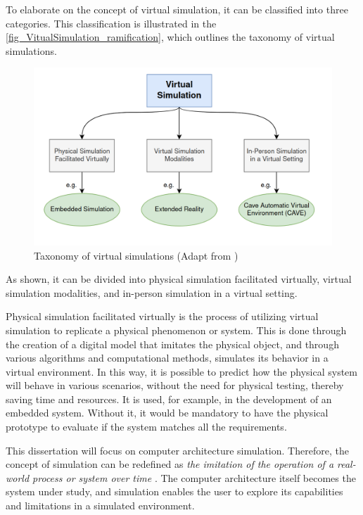 To elaborate on the concept of virtual simulation, it can be classified into three categories. This classification is illustrated in the  \autoref{fig_VitualSimulation_ramification}, which outlines the taxonomy of virtual simulations. 

\begin{figure}[H]
	\centering
 	\includegraphics[width=0.7\linewidth]{Images/VitualSimulation_ramification.png}
 	\caption{Taxonomy of virtual simulations (Adapt from \cite{verkuyl2022virtual})}
	 \label{fig_VitualSimulation_ramification}
\end{figure}


As shown, it can be divided into physical simulation facilitated virtually, virtual simulation modalities, and in-person simulation in a virtual setting. 

Physical simulation facilitated virtually is the process of utilizing virtual simulation to replicate a physical phenomenon or system. This is done through the creation of a digital model that imitates the physical object, and through various algorithms and computational methods, simulates its behavior in a virtual environment. In this way, it is possible to predict how the physical system will behave in various scenarios, without the need for physical testing, thereby saving time and resources. It is used, for example, in the development of an embedded system. Without it, it would be mandatory to have the physical prototype to evaluate if the system matches all the requirements. 

This dissertation will focus on computer architecture simulation. Therefore, the concept of simulation can be redefined as \emph{the imitation of the operation of a real-world process or system over time} \cite{banks1999introduction}. The computer architecture itself becomes the system under study, and simulation enables the user to explore its capabilities and limitations in a simulated environment.

